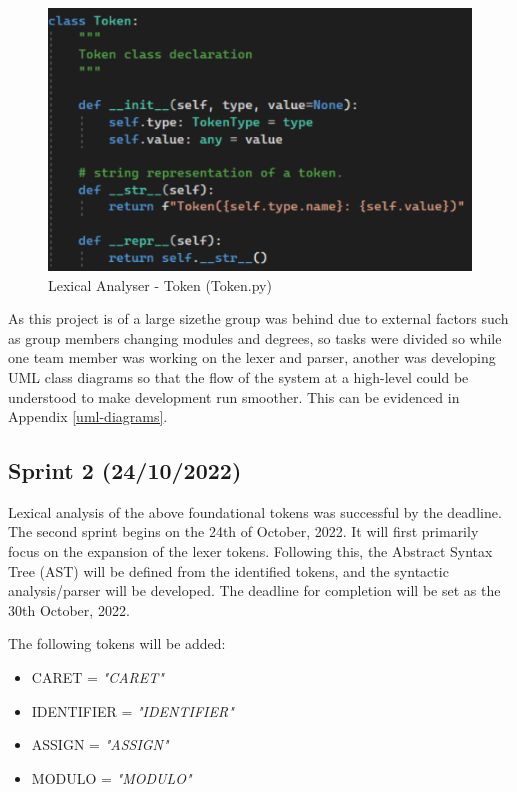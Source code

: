 \documentclass[a4paper, oneside, 11pt]{report}
\begin{document}
\begin{figure}[h]
    \centering
    \includegraphics[width=12.0cm]{tokenClass2.png}
    \caption{Lexical Analyser - Token (Token.py)}
    \label{fig:bnf}
\end{figure}

As this project is of a large sizethe group was behind due to external factors such as group members changing modules and degrees, so tasks were divided so while one team member was working on the lexer and parser, another was developing UML class diagrams so that the flow of the system at a high-level could be understood to make development run smoother. This can be evidenced in Appendix \ref{uml-diagrams}.

\subsection{Sprint 2 (24/10/2022)}
Lexical analysis of the above foundational tokens was successful by the deadline. The second sprint begins on the 24th of October, 2022. It will first primarily focus on the expansion of the lexer tokens. Following this, the Abstract Syntax Tree (AST) will be defined from the identified tokens, and the syntactic analysis/parser will be developed. The deadline for completion will be set as the 30th October, 2022.

The following tokens will be added:

\begin{itemize}
    \item CARET = \textit{"CARET"}
    \item IDENTIFIER = \textit{"IDENTIFIER"}
    \item ASSIGN = \textit{"ASSIGN"}
    \item MODULO = \textit{"MODULO"}
\end{itemize}
\end{document}
